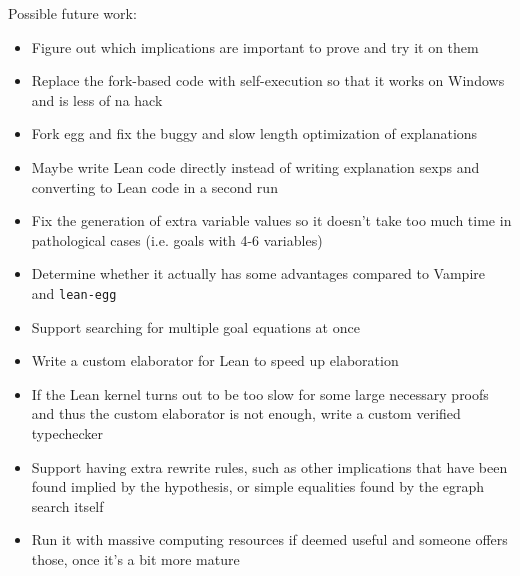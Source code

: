 Possible future work:

\begin{itemize}
	\item Figure out which implications are important to prove and try it on them
	\item Replace the fork-based code with self-execution so that it works on Windows and is less of na hack
	\item Fork egg and fix the buggy and slow length optimization of explanations
	\item Maybe write Lean code directly instead of writing explanation sexps and converting to Lean code in a second run
	\item Fix the generation of extra variable values so it doesn't take too much time in pathological cases (i.e. goals with 4-6 variables)
	\item Determine whether it actually has some advantages compared to Vampire and \texttt{lean-egg}
	\item Support searching for multiple goal equations at once
	\item Write a custom elaborator for Lean to speed up elaboration
	\item If the Lean kernel turns out to be too slow for some large necessary proofs and thus the custom elaborator is not enough, write a custom verified typechecker
	\item Support having extra rewrite rules, such as other implications that have been found implied by the hypothesis, or simple equalities found by the egraph search itself
	\item Run it with massive computing resources if deemed useful and someone offers those, once it's a bit more mature
\end{itemize}
